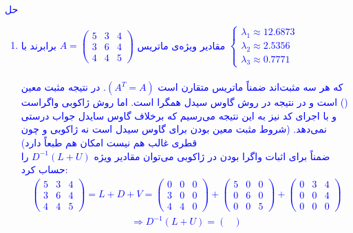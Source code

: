\textcolor{blue}{
حل
\\
\begin{enumerate}
\item
مقادیر ویژه‌ی ماتریس
$A = \begin{pmatrix}
    5 & 3 & 4 \\
    3 & 6 & 4 \\
    4 & 4 & 5
\end{pmatrix}$
برابرند با
$
\begin{cases}
    \lambda_1 \approx 12.6873 \\
    \lambda_2 \approx 2.5356 \\
    \lambda_3 \approx 0.7771
\end{cases}
$
\\ \\
که هر سه مثبت‌اند ضمناً
ماتریس متقارن است
$(A^T = A)$.
در نتیجه مثبت معین 
()
است و در نتیجه در روش گاوس سیدل همگرا است. اما روش 
ژاکوبی واگراست و با اجرای کد نیز به این نتیجه می‌رسیم که برخلاف گاوس سایدل جواب درستی نمی‌دهد. (شروط مثبت معین بودن برای گاوس سیدل است نه ژاکوبی و چون قطری غالب هم نیست امکان
هم طبعاً دارد)
\\
ضمناً برای اثبات واگرا بودن در ژاکوبی می‌توان مقادیر ویژه
$D^{-1} (L + U)$
را حساب کرد:
\begin{align*}
    \begin{pmatrix}
        5 & 3 & 4 \\
        3 & 6 & 4 \\
        4 & 4 & 5
    \end{pmatrix} = L +D + V = 
    \begin{pmatrix}
        0 & 0 & 0 \\
        3 & 0 & 0 \\
        4 & 4 & 0
    \end{pmatrix} + 
    \begin{pmatrix}
        5 & 0 & 0 \\
        0 & 6 & 0 \\
        0 & 0 & 5
    \end{pmatrix} +
    \begin{pmatrix}
        0 & 3 & 4 \\
        0 & 0 & 4 \\
        0 & 0 & 0
    \end{pmatrix}
\end{align*}
\begin{align*}
    \Rightarrow D^{-1} (L + U) = \begin{pmatrix}

\end{pmatrix}
\end{align*}
\end{enumerate}}
